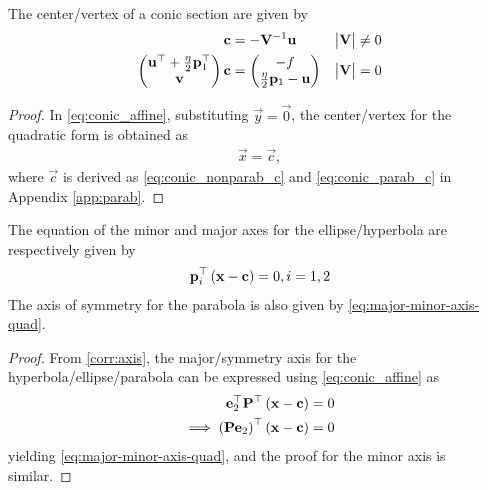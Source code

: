 \documentclass[journal,12pt,onecolumn]{IEEEtran}
\begin{document}
	\begin{corollary}
		The center/vertex of a conic section are given by
  \begin{align}
    \label{eq:conic_nonparab_c}
	    \mathbf{c} &= - \mathbf{V}^{-1}\mathbf{u}  & \begin{vmatrix}\mathbf{V}\end{vmatrix} \ne 0
    \\
	    \begin{pmatrix} \mathbf{u}^{\top}+\frac{\eta}{2}\mathbf{p}_1^{\top} \\ \mathbf{v}\end{pmatrix}\mathbf{c} &= \begin{pmatrix}-f \\ \frac{\eta}{2}\mathbf{p}_1-\mathbf{u}\end{pmatrix}  
& \begin{vmatrix}\mathbf{V}\end{vmatrix} = 0
    \label{eq:conic_parab_c}
    \end{align}	
	\end{corollary}
		\begin{proof}
			In 
			\eqref{eq:conic_affine}, substituting $\vec{y} = \vec{0}$, the center/vertex for the quadratic form is obtained as
    \begin{align}
	    \vec{x} = \vec{c}, 
    \end{align}
			where $\vec{c}$ is derived as 
    \eqref{eq:conic_nonparab_c}
    and 
    \eqref{eq:conic_parab_c}
in Appendix  \ref{app:parab}.
		\end{proof}

%
    \begin{corollary} The equation of the minor and major  axes for the ellipse/hyperbola are respectively given by 
  \begin{align}
\mathbf{p}_i^{\top}\left(\mathbf{x}-\mathbf{c}\right) = 0, i = 1,2
	  \label{eq:major-minor-axis-quad}
  \end{align}
  The axis of symmetry for the parabola is also given by 
	  \eqref{eq:major-minor-axis-quad}.
\end{corollary}
		\begin{proof}
From		\eqref{corr:axis}, the major/symmetry axis for the hyperbola/ellipse/parabola can be expressed using 
\eqref{eq:conic_affine} as
  \begin{align}
	  \mathbf{e}_2^{\top}
		  \mathbf{P}^{\top}\left(\mathbf{x}-\mathbf{c}\right) &= 0
		  \\
	  \implies 		  \left(\mathbf{P}\mathbf{e}_2\right)^{\top}\left(\mathbf{x}-\mathbf{c}\right) &= 0
  \end{align}
yielding	  \eqref{eq:major-minor-axis-quad}, and the proof for the minor axis is similar.
		\end{proof}
\end{document}

